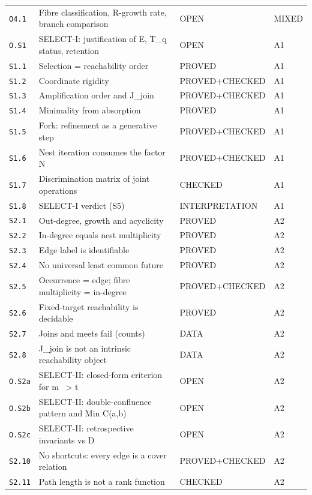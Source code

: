 \documentclass[11pt,oneside,openany]{book}
\theoremstyle{definition}
\theoremstyle{remark}
\begin{document}
\begin{longtable}{@{}p{16mm}p{59mm}p{38mm}p{13mm}@{}}
\texttt{O4.1} & Fibre classification, R-growth rate, branch comparison & OPEN & MIXED \\
\texttt{O.S1} & SELECT-I: justification of E, T\_q status, retention & OPEN & A1 \\
\texttt{S1.1} & Selection = reachability order & PROVED & A1 \\
\texttt{S1.2} & Coordinate rigidity & PROVED+CHECKED & A1 \\
\texttt{S1.3} & Amplification order and J\_join & PROVED+CHECKED & A1 \\
\texttt{S1.4} & Minimality from absorption & PROVED & A1 \\
\texttt{S1.5} & Fork: refinement as a generative step & PROVED+CHECKED & A1 \\
\texttt{S1.6} & Nest iteration consumes the factor N & PROVED+CHECKED & A1 \\
\texttt{S1.7} & Discrimination matrix of joint operations & CHECKED & A1 \\
\texttt{S1.8} & SELECT-I verdict (S5) & INTERPRETATION & A1 \\
\texttt{S2.1} & Out-degree, growth and acyclicity & PROVED & A2 \\
\texttt{S2.2} & In-degree equals nest multiplicity & PROVED & A2 \\
\texttt{S2.3} & Edge label is identifiable & PROVED & A2 \\
\texttt{S2.4} & No universal least common future & PROVED & A2 \\
\texttt{S2.5} & Occurrence = edge; fibre multiplicity = in-degree & PROVED+CHECKED & A2 \\
\texttt{S2.6} & Fixed-target reachability is decidable & PROVED & A2 \\
\texttt{S2.7} & Joins and meets fail (counts) & DATA & A2 \\
\texttt{S2.8} & J\_join is not an intrinsic reachability object & DATA & A2 \\
\texttt{O.S2a} & SELECT-II: closed-form criterion for m ~> t & OPEN & A2 \\
\texttt{O.S2b} & SELECT-II: double-confluence pattern and Min C(a,b) & OPEN & A2 \\
\texttt{O.S2c} & SELECT-II: retrospective invariants vs D & OPEN & A2 \\
\texttt{S2.10} & No shortcuts: every edge is a cover relation & PROVED+CHECKED & A2 \\
\texttt{S2.11} & Path length is not a rank function & CHECKED & A2 \\

\end{longtable}
\end{document}
